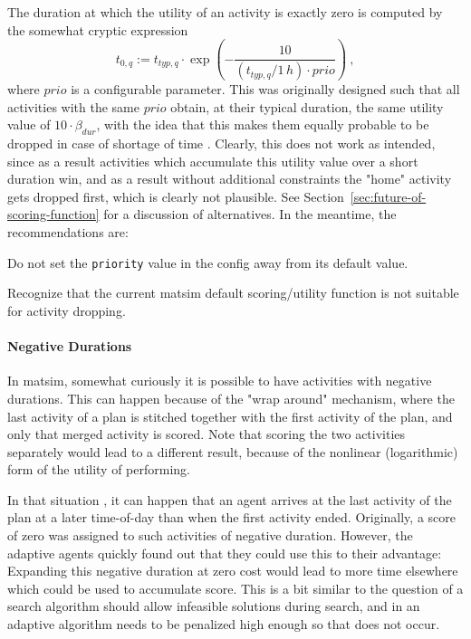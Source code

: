 The duration at which the utility of an activity is exactly zero is computed by the somewhat cryptic expression
\[
t_{0,q} := t_{typ,q} \cdot \exp\left( - \frac{10}{(t_{typ,q}/1\,h) \cdot prio} \right) \ ,
\]
where $prio$ is a configurable parameter. This was originally designed such that all activities with the same $prio$ obtain, at their typical duration, the same utility value of $10 \cdot \beta_{dur}$, with the idea that this makes them equally probable to be dropped in case of shortage of time \cite{CharyparNagel2005ga4acts}. Clearly, this does not work as intended, since as a result activities which accumulate this utility value over a short duration win, and as a result without additional constraints the "home" activity gets dropped first, which is clearly not plausible. See Section~\ref{sec:future-of-scoring-function} for a discussion of alternatives. In the meantime, the recommendations are:
\begin{compactitem}
\item Do not set the \lstinline$priority$ value in the config away from its default value.
\item Recognize that the current \gls{matsim} default scoring/utility function is not suitable for activity dropping.
\end{compactitem}

\paragraph*{Negative Durations}

In \gls{matsim}, somewhat curiously it is possible to have activities with negative durations. This can happen because of the "wrap around" mechanism, where the last activity of a plan is stitched together with the first activity of the plan, and only that merged activity is scored. Note that scoring the two activities separately would lead to a different result, because of the nonlinear (logarithmic) form of the utility of performing. 



In that situation , it can happen that an agent arrives at the last activity of the plan at a later time-of-day than when the first activity ended.  Originally, a score of zero was assigned to such activities of negative duration. However, the adaptive agents quickly found out that they could use this to their advantage: Expanding this negative duration at zero cost would lead to more time elsewhere which could be used to accumulate score. This is a bit similar to the question of a search algorithm should allow infeasible solutions during search, and in an adaptive algorithm needs to be penalized high enough so that does not occur.


